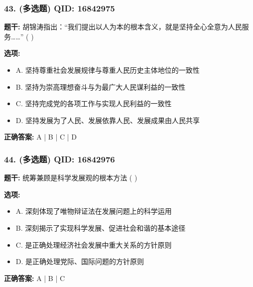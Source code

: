 \documentclass[12pt,UTF8]{ctexart}
\begin{document}
\subsubsection*{43. (多选题) \small QID: 16842975}

\textbf{题干:}
胡锦涛指出：“我们提出以人为本的根本含义，就是坚持全心全意为人民服务……” ( )

\textbf{选项:}
\begin{itemize}[leftmargin=*]

  \item A. 坚持尊重社会发展规律与尊重人民历史主体地位的一致性

  \item B. 坚持为崇高理想奋斗与为最广大人民谋利益的一致性

  \item C. 坚持完成党的各项工作与实现人民利益的一致性

  \item D. 坚持发展为了人民、发展依靠人民、发展成果由人民共享

\end{itemize}

\textbf{正确答案:}
A | B | C | D

\vspace{0.3em}\hrulefill\vspace{0.7em}

\subsubsection*{44. (多选题) \small QID: 16842976}

\textbf{题干:}
统筹兼顾是科学发展观的根本方法 ( )

\textbf{选项:}
\begin{itemize}[leftmargin=*]

  \item A. 深刻体现了唯物辩证法在发展问题上的科学运用

  \item B. 深刻揭示了实现科学发展、促进社会和谐的基本途径

  \item C. 是正确处理经济社会发展中重大关系的方针原则

  \item D. 是正确处理党际、国际问题的方针原则

\end{itemize}

\textbf{正确答案:}
A | B | C

\vspace{0.3em}\hrulefill\vspace{0.7em}
\end{document}
